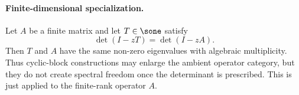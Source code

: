 \paragraph{Finite-dimensional specialization.}
  Let \(A\) be a finite matrix and let \(T\in \sone\) satisfy
  \[
    \det(I-zT)=\det(I-zA).
  \]
  Then \(T\) and \(A\) have the same non-zero eigenvalues with
  algebraic multiplicity. Thus cyclic-block constructions may enlarge
  the ambient operator category, but they do not create spectral
  freedom once the determinant is prescribed. This is just
   applied to the finite-rank
  operator \(A\).



